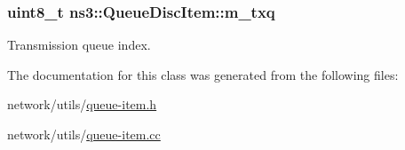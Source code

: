 \subsubsection[{\texorpdfstring{m\+\_\+txq}{m_txq}}]{\setlength{\rightskip}{0pt plus 5cm}uint8\+\_\+t ns3\+::\+Queue\+Disc\+Item\+::m\+\_\+txq\hspace{0.3cm}{\ttfamily [private]}}\hypertarget{classns3_1_1QueueDiscItem_a109c7b6161c715175d5c7f7b6e423aa4}{}\label{classns3_1_1QueueDiscItem_a109c7b6161c715175d5c7f7b6e423aa4}


Transmission queue index. 



The documentation for this class was generated from the following files\+:\begin{DoxyCompactItemize}
\item 
network/utils/\hyperlink{queue-item_8h}{queue-\/item.\+h}\item 
network/utils/\hyperlink{queue-item_8cc}{queue-\/item.\+cc}\end{DoxyCompactItemize}
